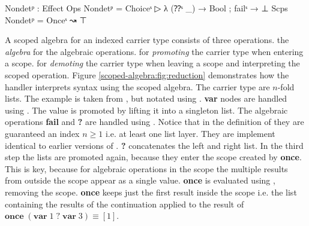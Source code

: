 \begin{code}
Nondetᵖ : Effect
Ops   Nondetᵖ = Choiceˢ  ▷ λ{ (⁇ˢ _) → Bool ; failˢ → ⊥ }
Scps  Nondetᵖ = Onceˢ    ↝ ⊤
\end{code}
A scoped algebra for an  indexed carrier type 
consists of three operations.
 the \textit{algebra} for the algebraic operations.
 for \textit{promoting} the carrier type when entering a scope.
 for \textit{demoting} the carrier type when leaving a scope and
interpreting the scoped operation.
Figure \ref{scoped-algebra:fig:reduction} demonstrates how the handler
interprets  syntax using the scoped algebra.
The carrier type are $n$-fold lists.
The example is taken from \textcite{DBLP:conf/lics/PirogSWJ18}, but notated
using
\AgdaSpace{}\AgdaSpace{}.
\textbf{var} nodes are handled using .
The value is promoted by lifting it into a singleton list.
The algebraic operations \textbf{fail} and \textbf{?} are handled using
.
Notice that in the definition of  they are guaranteed an index
$n\geqslant 1$ i.e. at least one list layer.
They are implement identical to earlier versions of .
\textbf{?} concatenates the left and right list.
In the third step the lists are promoted again, because they enter the scope
created by \textbf{once}.
This is key, because for algebraic operations in the scope the multiple results
from outside the scope appear as a single value.
\textbf{once} is evaluated using , removing the scope.
\textbf{once} keeps just the first result inside the scope i.e. the list
containing the results of the continuation applied to the result of
$\textbf{once}\;(\textbf{var}\;1\;?\;\textbf{var}\;3)\equiv [1]$.

